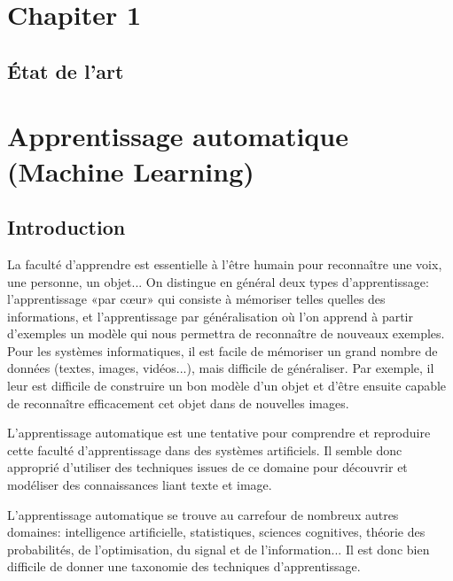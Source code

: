 \documentclass[12pt]{article}
\begin{document}
\thispagestyle{empty}
\cleardoublepage

\tableofcontents
\thispagestyle{empty}
\newpage


\listoffigures
{}
\cleardoublepage

\listoftables
{}
\cleardoublepage

\setcounter{page}{1}
\section*{\Huge{Chapiter 1}}
\subsection*{\huge{\' Etat de l'art}}
\newpage
{}
\section{Apprentissage automatique (Machine Learning)}
\subsection{Introduction}
La faculté d'apprendre est essentielle à l'être humain pour reconnaître une voix, une personne, un objet... On distingue en général deux types d'apprentissage: l'apprentissage «par cœur» qui consiste à mémoriser telles quelles des informations, et l'apprentissage par généralisation où l'on apprend à partir d'exemples un modèle qui nous permettra de reconnaître de nouveaux exemples. Pour les systèmes informatiques, il est facile de mémoriser un grand nombre de données (textes, images, vidéos...), mais difficile de généraliser. Par exemple, il leur est difficile de construire un bon modèle d'un objet et d'être ensuite capable de reconnaître efficacement cet objet dans de nouvelles images.

L'apprentissage automatique est une tentative pour comprendre et reproduire cette faculté d'apprentissage dans des systèmes artificiels. Il semble donc approprié d'utiliser des techniques issues de ce domaine pour découvrir et modéliser des connaissances liant texte et image.

L'apprentissage automatique se trouve au carrefour de nombreux autres domaines: intelligence artificielle, statistiques, sciences cognitives, théorie des probabilités, de l'optimisation, du signal et de l'information... Il est donc bien difficile de donner une taxonomie des techniques d'apprentissage.
\end{document}
